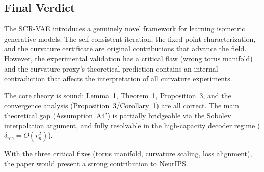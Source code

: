 \documentclass{article}
\begin{document}
\subsection{Final Verdict}

The SCR-VAE introduces a genuinely novel framework for learning isometric
generative models. The self-consistent iteration, the fixed-point
characterization, and the curvature certificate are original contributions
that advance the field. However, the experimental validation has a critical
flaw (wrong torus manifold) and the curvature proxy's theoretical prediction
contains an internal contradiction that affects the interpretation of all
curvature experiments.

The core theory is sound: Lemma~1, Theorem~1, Proposition~3, and the
convergence analysis (Proposition~3/Corollary~1) are all correct. The main
theoretical gap (Assumption~A4') is partially bridgeable via the Sobolev
interpolation argument, and fully resolvable in the high-capacity decoder
regime ($\delta_{\mathrm{rec}} = O(r_n^2)$).

With the three critical fixes (torus manifold, curvature scaling, loss
alignment), the paper would present a strong contribution to NeurIPS.
\end{document}
